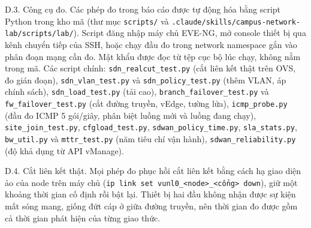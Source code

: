 D.3. Công cụ đo. Các phép đo trong báo cáo được tự động hóa bằng script Python trong kho mã (thư mục \texttt{scripts/} và \texttt{.claude/skills/campus-network-lab/scripts/lab/}). Script đăng nhập máy chủ EVE-NG, mở console thiết bị qua kênh chuyển tiếp của SSH, hoặc chạy đầu đo trong network namespace gắn vào phân đoạn mạng cần đo. Mật khẩu được đọc từ tệp cục bộ lúc chạy, không nằm trong mã. Các script chính: \texttt{sdn\_realcut\_test.py} (cắt liên kết thật trên OVS, đo gián đoạn), \texttt{sdn\_vlan\_test.py} và \texttt{sdn\_policy\_test.py} (thêm VLAN, áp chính sách), \texttt{sdn\_load\_test.py} (tải cao), \texttt{branch\_failover\_test.py} và \texttt{fw\_failover\_test.py} (cắt đường truyền, vEdge, tường lửa), \texttt{icmp\_probe.py} (đầu đo ICMP 5 gói/giây, phân biệt luồng mới và luồng đang chạy), \texttt{site\_join\_test.py}, \texttt{cfgload\_test.py}, \texttt{sdwan\_policy\_time.py}, \texttt{sla\_stats.py}, \texttt{bw\_util.py} và \texttt{mttr\_test.py} (năm tiêu chí vận hành), \texttt{sdwan\_reliability.py} (độ khả dụng từ API vManage).

D.4. Cắt liên kết thật. Mọi phép đo phục hồi cắt liên kết bằng cách hạ giao diện ảo của node trên máy chủ (\texttt{ip link set vunl0\_<node>\_<cổng> down}), giữ một khoảng thời gian cố định rồi bật lại. Thiết bị hai đầu không nhận được sự kiện mất sóng mang, giống đứt cáp ở giữa đường truyền, nên thời gian đo được gồm cả thời gian phát hiện của từng giao thức.
